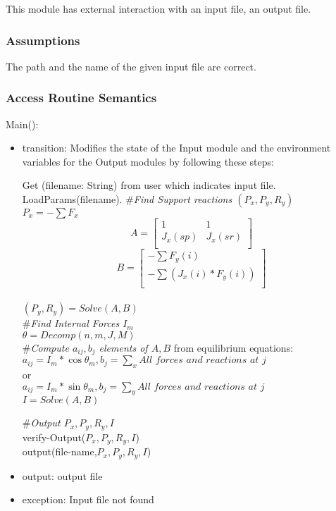 \documentclass[12pt, titlepage]{article}
\begin{document}
This module has external interaction with an input file, an output file.

\subsubsection{Assumptions}

The path and the name of the given input file are correct.

\subsubsection{Access Routine Semantics}

\noindent Main():  
\begin{itemize}
\item transition: Modifies the state of the Input module and the environment variables for the Output modules by following these steps:

Get (filename: String) from user which indicates input file.
LoadParams(filename).
\#\textit{Find Support reactions $(P_x,P_y,R_y)$}\\
$P_x=-\sum F_x$\\
\[A=
   \left[ {\begin{array}{cc}
    1 & 1 \\
    J_x(sp) & J_x(sr) \\
  \end{array} } \right]\]
\[B=
   \left[ {\begin{array}{cc}
    -\sum F_y(i) \\
    -\sum (J_x(i)* F_y(i))  \\
  \end{array} } \right]
\]\\ 
$(P_y,R_y) = Solve(A,B)$\\

\#\textit{Find Internal Forces $I_m$}\\
$\theta= Decomp (n,m,J,M)$\\

\#\textit{Compute $a_{ij},b_j$ elements of $A,B$} from equilibrium equations:\\
$a_{ij}=I_m*\cos\theta_{m},b_j=\sum_x \textit{All forces and reactions at j}$\\
or\\
$a_{ij}=I_m*\sin\theta_{m},b_j=\sum_y \textit{All forces and reactions at j}$\\

$I=Solve(A,B)$

\#\textit{Output $P_x,P_y,R_y,I$}\\

verify-Output($P_x,P_y,R_y,I$)\\
output(file-name,$P_x,P_y,R_y,I$)\\

\item output: output file
\item exception:  Input file not found
\end{itemize}
\end{document}
